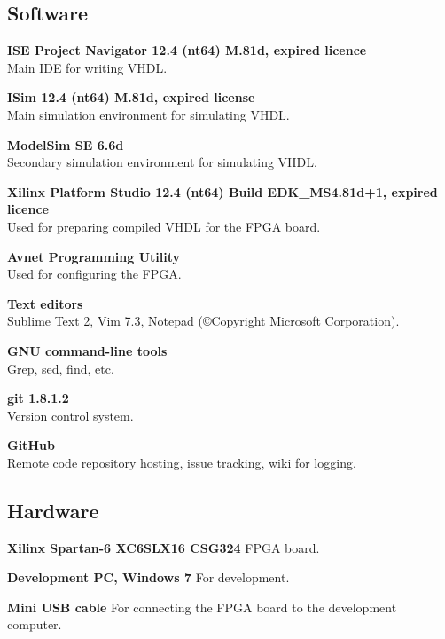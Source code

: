 
\subsection{Software}
\begin{description}
    \item{\textbf{ISE Project Navigator 12.4 (nt64) M.81d, expired licence}} \\
        Main IDE for writing VHDL.
    \item{\textbf{ISim 12.4 (nt64) M.81d, expired license}} \\
        Main simulation environment for simulating VHDL.
    \item{\textbf{ModelSim SE 6.6d}} \\
        Secondary simulation environment for simulating VHDL.
    \item{\textbf{Xilinx Platform Studio 12.4 (nt64) Build EDK\_MS4.81d+1, expired licence}} \\
        Used for preparing compiled VHDL for the FPGA board.
    \item{\textbf{Avnet Programming Utility}} \\
        Used for configuring the FPGA.
    \item{\textbf{Text editors}} \\
        Sublime Text 2, Vim 7.3, Notepad (©Copyright Microsoft Corporation).
    \item{\textbf{GNU command-line tools}} \\
        Grep, sed, find, etc.
    \item{\textbf{git 1.8.1.2}} \\
        Version control system.
    \item{\textbf{GitHub}} \\
        Remote code repository hosting, issue tracking, wiki for logging.
\end{description}

\subsection{Hardware}
\begin{description}
\item{\textbf{Xilinx Spartan-6 XC6SLX16 CSG324}}
    FPGA board.
\item{\textbf{Development PC, Windows 7}}
    For development.
\item{\textbf{Mini USB cable}}
    For connecting the FPGA board to the development computer.
\end{description}


\bigskip
